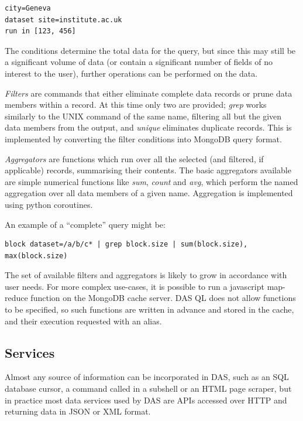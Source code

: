 \documentclass[a4paper]{jpconf}
\begin{document}
\begin{verbatim}
city=Geneva
dataset site=institute.ac.uk
run in [123, 456]
\end{verbatim}

The conditions determine the total data for the query, but since this may still be a significant volume of data (or contain a significant number of fields of no interest to the user), further operations can be performed on the data.

\emph{Filters} are commands that either eliminate complete data records or prune data members within a record. At this time only two are provided; \emph{grep} works similarly to the UNIX command of the same name, filtering all but the given data members from the output, and \emph{unique} eliminates duplicate records. This is implemented by converting the filter conditions into MongoDB query format.

\emph{Aggregators} are functions which run over all the selected (and filtered, if applicable) records, summarising their contents. The basic aggregators available are simple numerical functions like \emph{sum}, \emph{count} and \emph{avg}, which perform the named aggregation over all data members of a given name. Aggregation is implemented using python coroutines.

An example of a ``complete'' query might be:

\begin{verbatim}
block dataset=/a/b/c* | grep block.size | sum(block.size), max(block.size)
\end{verbatim}

The set of available filters and aggregators is likely to grow in accordance with user needs. For more complex use-cases, it is possible to run a javascript map-reduce function on the MongoDB cache server. DAS QL does not allow functions to be specified, so such functions are written in advance and stored in the cache, and their execution requested with an alias.

\subsection{\label{services}Services}

Almost any source of information can be incorporated in DAS, such as an SQL database cursor, a command called in a subshell or an HTML page scraper, but in practice most data services used by DAS are APIs accessed over HTTP and returning data in JSON or XML format.
\end{document}
